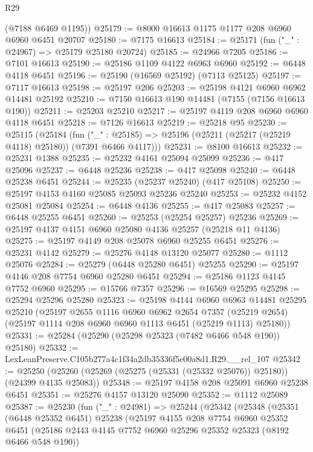 \begin{lexlean}{R29}
\begin{coremodule}
      (@7188 @6469 @1195))
@25179 := @8000 @16613 @1175 @1177 @208 @6960 @6960 @6451 @20707
@25180 := @7175 @16613
@25184 := @25171 (fun ("_" : @24967) => @25179 @25180 @20724)
@25185 := @24966 @7205
@25186 := @7101 @16613
@25190 := @25186 @1109 @4122 @6963 @6960
@25192 := @6448 @4118 @6451
@25196 := @25190 (@16569 @25192) (@7113 @25125)
@25197 := @7117 @16613
@25198 := @25197 @206
@25203 := @25198 @4121 @6960 @6962 @14481 @25192
@25210 := @7150 @16613 @190 @14481 (@7155 (@7156 @16613 @190))
@25211 := @25203 @25210
@25217 := @25197 @4119 @208 @6960 @6960 @4118 @6451
@25218 := @7126 @16613
@25219 := @25218 @95
@25230 := @25115
    (@25184
      (fun ("_" : @25185) => @25196 (@25211 (@25217 (@25219 @4118) @25180)) (@7391 @6466 @4117)))
@25231 := @8100 @16613
@25232 := @25231 @1388
@25235 := @25232 @4161 @25094 @25099
@25236 := @417 @25096
@25237 := @6448 @25236
@25238 := @417 @25098
@25240 := @6448 @25238 @6451
@25244 := @25235 (@25237 @25240) (@417 @25108)
@25250 := @25197 @4153 @4160 @25085 @25093 @25236 @25240
@25253 := @25232 @4152 @25081 @25084
@25254 := @6448 @4136
@25255 := @417 @25083
@25257 := @6448 @25255 @6451
@25260 := @25253 (@25254 @25257) @25236
@25269 := @25197 @4137 @4151 @6960 @25080 @4136 @25257 (@25218 @11 @4136)
@25275 := @25197 @4149 @208 @25078 @6960 @25255 @6451
@25276 := @25231 @4142
@25279 := @25276 @4148 @13120 @25077
@25280 := @1112 @25076
@25284 := @25279 (@6448 @25280 @6451) @25255
@25290 := @25197 @4146 @208 @7754 @6960 @25280 @6451
@25294 := @25186 @1123 @4145 @7752 @6960
@25295 := @15766 @7357
@25296 := @16569 @25295
@25298 := @25294 @25296 @25280
@25323 := @25198
    @4144
    @6960
    @6963
    @14481
    @25295
    @25210
    (@25197
      @2655
      @1116
      @6960
      @6962
      @2654
      @7357
      (@25219 @2654)
      (@25197 @1114 @208 @6960 @6960 @1113 @6451 (@25219 @1113) @25180))
@25331 := @25284 (@25290 (@25298 @25323 (@7482 @6466 @548 @190)) @25180)
@25332 := LexLeanPreserve.C105b277a4c1f34a2db35336f5e00a8d1.R29.__rel_107
@25342 := @25250 (@25260 (@25269 (@25275 (@25331 (@25332 @25076)) @25180)) (@24399 @4135 @25083))
@25348 := @25197 @4158 @208 @25091 @6960 @25238 @6451
@25351 := @25276 @4157 @13120 @25090
@25352 := @1112 @25089
@25387 := @25230
    (fun ("_" : @24981) =>
    @25244
      (@25342
        (@25348
          (@25351
            (@6448 @25352 @6451)
            @25238
            (@25197
              @4155
              @208
              @7754
              @6960
              @25352
              @6451
              (@25186 @2443 @4145 @7752 @6960 @25296 @25352 @25323 (@8192 @6466 @548 @190))

\end{coremodule}
\end{lexlean}
